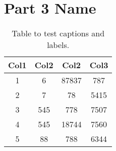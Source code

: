 \section{Part 3 Name}

\lipsum[1]

\begin{table}[h!]
    \centering
    \begin{tabular}{||c c c c||} 
    \hline
    Col1 & Col2 & Col2 & Col3 \\ [0.5ex] 
    \hline\hline
     1 & 6 & 87837 & 787 \\ 
     2 & 7 & 78 & 5415 \\
     3 & 545 & 778 & 7507 \\
     4 & 545 & 18744 & 7560 \\
     5 & 88 & 788 & 6344 \\ [1ex] 
    \hline
    \end{tabular}
    \caption{Table to test captions and labels.}
    \label{table:1}
\end{table}